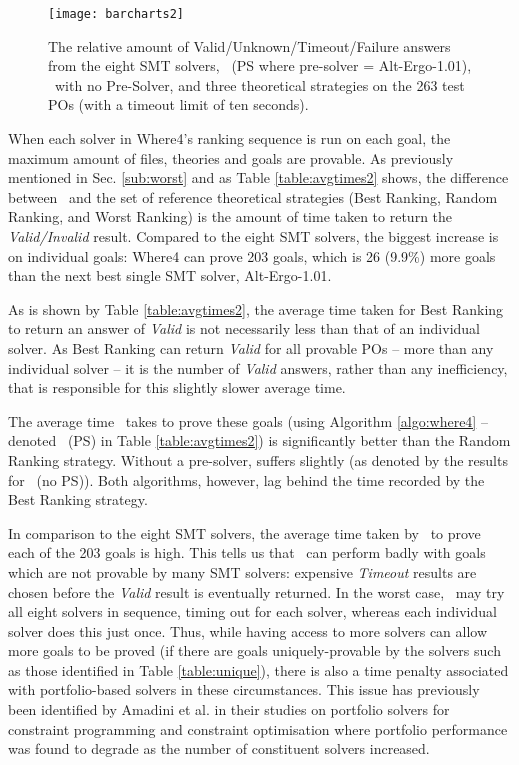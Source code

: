 \begin{figure}
	\centering
	\texttt{[image: barcharts2]}
	\caption[The relative amount of Valid/Unknown/Timeout/Failure answers from the eight SMT solvers and the top-ranking solver from the three theoretical strategies and \where~(w/(o) presolving).]{The relative amount of Valid/Unknown/Timeout/Failure answers from the eight SMT solvers, \where~(PS where pre-solver = Alt-Ergo-1.01), \where~with no Pre-Solver, and three theoretical strategies on the 263 test POs (with a timeout limit of ten seconds).}
	\label{fig:barchart2}
\end{figure}


When each solver in \textsf{Where4}'s ranking sequence is run on each goal, the maximum amount of files, theories and goals are provable. 
As previously mentioned in Sec. \ref{sub:worst} and as Table \ref{table:avgtimes2} shows, the difference between \where~and the set of reference theoretical strategies (\textsf{Best Ranking}, \textsf{Random Ranking}, and \textsf{Worst Ranking}) is the amount of time taken to return the \textit{Valid/Invalid} result. 
Compared to the eight SMT solvers, the biggest increase is on individual goals: \textsf{Where4} can prove 203 goals, which is 26 (9.9\%) more goals than the next best single SMT solver, Alt-Ergo-1.01.

As is shown by Table \ref{table:avgtimes2}, the average time taken for \textsf{Best Ranking} to return an answer of \textit{Valid} is not necessarily less than that of an individual solver. 
As \textsf{Best Ranking} can return \textit{Valid} for all provable POs -- more than any individual solver --
it is the number of \textit{Valid} answers, rather than any inefficiency, that is responsible for this slightly slower average time.  

The average time \where~takes to prove these goals 
(using Algorithm \ref{algo:where4} -- denoted \where~(PS) in Table \ref{table:avgtimes2}) 
is significantly better than the \textsf{Random Ranking} strategy.
Without a pre-solver, \where suffers slightly (as denoted by the results for \where~(no PS)). 
Both algorithms, however, lag behind the time recorded by the \textsf{Best Ranking} strategy. 

In comparison to the eight SMT solvers, the average time taken by \where~to prove each of the 203 goals is high. 
This tells us that \where~can perform badly with goals which are not provable by many SMT solvers: expensive \textit{Timeout} results are chosen before the \textit{Valid} result is eventually returned. 
In the worst case, \where~may try all eight solvers in sequence, timing out for each solver, whereas each individual solver does this just once. 
Thus, while having access to more solvers can allow more goals to be proved (if there are goals uniquely-provable by the solvers such as those identified in Table \ref{table:unique}), there is also a time penalty associated with portfolio-based solvers in these circumstances.
This issue has previously been identified by Amadini et al. in their studies on portfolio solvers for constraint programming \cite{Amadini2013} and constraint optimisation \cite{Amadini2016} where portfolio performance was found to degrade as the number of constituent solvers increased.

